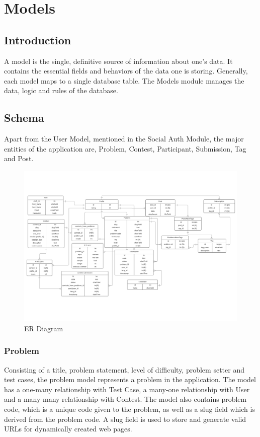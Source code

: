 
\newpage

\section{Models}

\subsection{Introduction}
A model is the single, definitive source of information about one’s data. It contains the essential fields and behaviors of the data one is storing. Generally, each model maps to a single database table. The Models module manages the data, logic and rules of the database.


\subsection{Schema}
Apart from the User Model, mentioned in the Social Auth Module, the major entities of the application are, Problem, Contest, Participant, Submission, Tag and Post.
\begin{figure}[h!]
    \centering
    \includegraphics[width=\linewidth]{modules/schema.pdf}
    \caption{ER Diagram}
    \label{fig:schema}
\end{figure}

\vspace{1cm}

\subsubsection{Problem}
Consisting of a title, problem statement, level of difficulty, problem setter and test cases, the problem model represents a problem in the application. The model has a one-many relationship with Test Case, a many-one relationship with User and a many-many relationship with Contest. The model also contains problem code, which is a unique code given to the problem, as well as a slug field which is derived from the problem code. A slug field is used to store and generate valid URLs for dynamically created web pages. 

